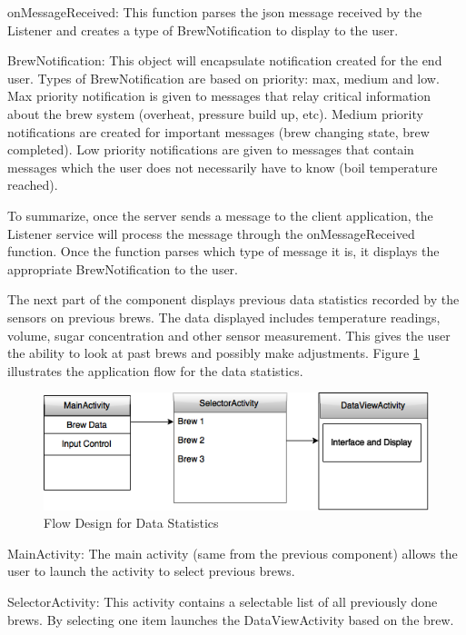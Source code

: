 \documentclass{article}
\begin{document}
\noindent onMessageReceived: This function parses the \gls{json} message received by the Listener and creates a type of BrewNotification to display to the user.

\noindent BrewNotification: This object will encapsulate notification created for the end user. Types of BrewNotification are based on priority: max, medium and low. Max priority notification is given to messages that relay critical information about the brew system (overheat, pressure build up, etc). Medium priority notifications are created for important messages (brew changing state, brew completed). Low priority notifications are given to messages that contain messages which the user does not necessarily have to know (boil temperature reached).

\noindent To summarize, once the server sends a message to the client application,  the Listener service will process the message through the onMessageReceived function. Once the function parses which type of message it is, it displays the appropriate BrewNotification to the user.

\noindent The next part of the component displays previous data statistics recorded by the sensors on previous brews. The data displayed includes temperature readings, volume, sugar concentration and other sensor measurement. This gives the user the ability to look at past brews and possibly make adjustments. Figure \ref{fig:data-statistics} illustrates the application flow for the data statistics.

\begin{figure}[H]
\begin{center}
\includegraphics[scale=0.70]{data-statistics.png}
\caption{Flow Design for Data Statistics}
\label{fig:data-statistics}
\end{center}
\end{figure}

\noindent MainActivity: The main activity (same from the previous component) allows the user to launch the activity to select previous brews.

\noindent SelectorActivity: This activity contains a selectable list of all previously done brews. By selecting one item launches the DataViewActivity based on the brew.
\end{document}
